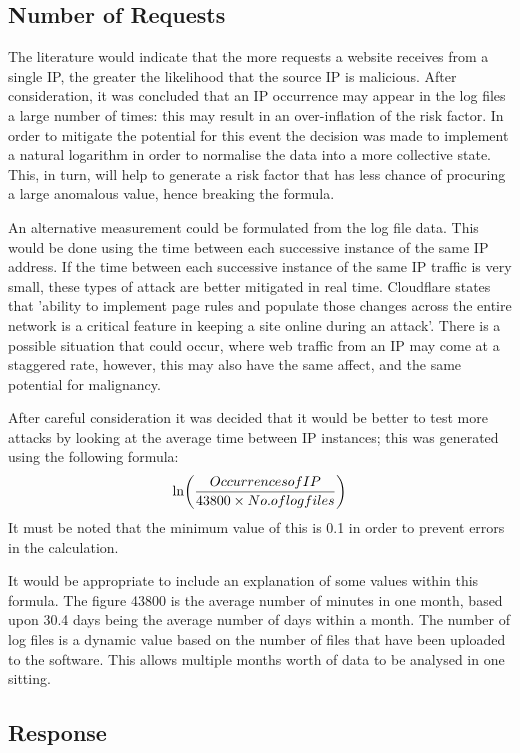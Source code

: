  
\subsection{Number of Requests}
The literature would indicate that the more requests a website receives from a single IP, the greater the likelihood that the source IP is malicious. After consideration, it was concluded that an IP occurrence may appear in the log files a large number of times: this may result in an over-inflation of the risk factor. In order to mitigate the potential for this event the decision was made to implement a natural logarithm in order to normalise the data into a more collective state. This, in turn, will help to generate a risk factor that has less chance of procuring a large anomalous value, hence breaking the formula.

An alternative measurement could be formulated from the log file data. This would be done using the time between each successive instance of the same IP address. If the time between each successive instance of the same IP traffic is very small, these types of attack are better mitigated in real time. Cloudflare states that 'ability to implement page rules and populate those changes across the entire network is a critical feature in keeping a site online during an attack'. There is a possible situation that could occur, where web traffic from an IP may come at a staggered rate, however, this may also have the same affect, and the same potential for malignancy. 

After careful consideration it was decided that it would be better to test more attacks by looking at the average time between IP instances; this was generated using the following formula: \[\lnb{\dfrac{Occurrences of IP }{43800 \times No. of log files}}\] It must be noted that the minimum value of this is 0.1 in order to prevent errors in the calculation. 

It would be appropriate to include an explanation of some values within this formula. The figure 43800 is the average number of minutes in one month, based upon 30.4 days being the average number of days within a month. The number of log files is a dynamic value based on the number of files that have been uploaded to the software. This allows multiple months worth of data to be analysed in one sitting.

\subsection{Response}


